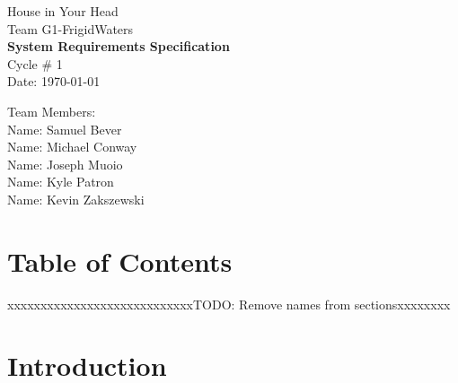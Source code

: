 \documentclass{article}
\begin{document}
\begin{titlepage}
    \begin{center}
        \begin{huge}
        House in Your Head \\[1cm]
        Team G1-FrigidWaters \\[2.2cm]
        { \bfseries System Requirements Specification } \\[1cm]
        Cycle \# 1\\[2.2cm]
        Date: \required\today\\[1cm]
        \end{huge}
    \end{center}
    \null \vfill
    \begin{large}
        Team Members: \\[0.5cm]
        Name: Samuel Bever\\[0.5cm]
        Name: Michael Conway\\[0.5cm]
        Name: Joseph Muoio\\[0.5cm]
        Name: Kyle Patron\\[0.5cm]
        Name: Kevin Zakszewski
    \end{large}
\end{titlepage}
\section*{\centering Table of Contents}
\makeatletter
{}
\newcommand{\hsubsubsection}{
\@startsection{subsubsection}{3}{\z@}%
                                     {-3.25ex\@plus -1ex \@minus -.2ex}%
                                     {-1.5ex \@plus -.2ex}%
                                     {R\normalfont\normalsize}}
\newcommand{\hparagraph}{
\@startsection{paragraph}{4}{\z@}%
                                     {-3.25ex\@plus -1ex \@minus -.2ex}%
                                     {-1.5ex \@plus -.2ex}%
                                     {R\normalfont\normalsize}}
\newcommand{\hsubparagraph}{
\@startsection{subparagraph}{5}{\z@}%
                                     {-3.25ex\@plus -1ex \@minus -.2ex}%
                                     {-1.5ex \@plus -.2ex}%
                                     {R\normalfont\normalsize}}
\setcounter{secnumdepth}{5}
\makeatother
\newpage
 

{\color{red}xxxxxxxxxxxxxxxxxxxxxxxxxxxxTODO: Remove names from sectionsxxxxxxxx}
\section{Introduction}
\end{document}
